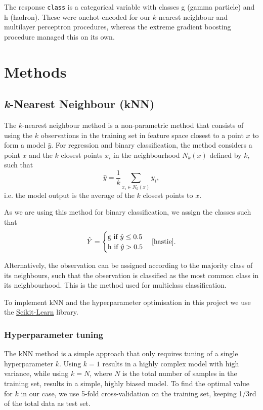 \documentclass[a4paper, 11pt, twocolumn]{article}
\begin{document}
The response \texttt{class} is a categorical variable with classes g (gamma 
particle) and h (hadron). These were onehot-encoded for our $k$-nearest neighbour 
and multilayer perceptron procedures, whereas the extreme gradient boosting 
procedure managed this on its own. 

\section{Methods}

\subsection{\textit{k}-Nearest Neighbour (kNN)}
The $k$-nearest neighbour method is a non-parametric method that consists of
using the $k$ observations in the training set in feature space closest to a point
$x$ to form a model $\hat{y}$. For regression and binary classification, the
method considers a point $x$ and the $k$ closest points $x_i$ in the
neighbourhood $N_k(x)$ defined by $k$, such that
\begin{equation} \label{eq:kNN}
\hat{y} = \frac{1}{k}\sum_{x_i\in N_k(x)} y_i,
\end{equation}
i.e. the model output is the average of the $k$ closest points to $x$.

As we are using this method for binary classification, we assign the classes 
such that
\begin{equation}
\hat{Y}=
\begin{cases}
      \text{g if }  \hat{y}\leq 0.5\\
      \text{h if } \hat{y} > 0.5
\end{cases} \cite{hastie}.
\end{equation}

Alternatively, the observation can be assigned according to the majority class of
its neighbours, such that the observation is classified as the most common class
in its neighbourhood. This is the method used for multiclass classification.

To implement kNN and the hyperparameter optimisation in this project we use the
\href{https://scikit-learn.org/stable}{Scikit-Learn}
library.

\subsubsection{Hyperparameter tuning}
The kNN method is a simple approach that only requires tuning of a single
hyperparameter $k$. Using $k=1$ results in a highly complex model with high
variance, while using $k=N$, where $N$ is the total number of samples in the
training set, results in a simple, highly biased model. To find the optimal value
for $k$ in our case, we use 5-fold cross-validation on the training set, keeping
1/3rd of the total data as test set.
\end{document}
